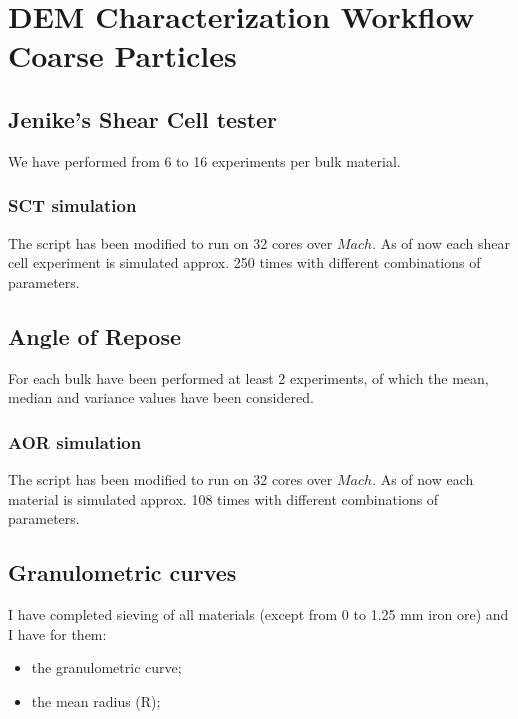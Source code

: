 
\section{DEM Characterization Workflow Coarse Particles}
\label{section:Demcharacterizationworkflowcoarseparticles}

\subsection{Jenike's  Shear Cell tester}
\label{subsection:jenikeshearcell}

We have performed from 6 to 16 experiments per bulk material.\\

\subsubsection{SCT simulation}
\label{subsubsection:sctsimulation}

The script has been modified to run on 32 cores over $Mach$. As of now each shear cell experiment is simulated approx. 250 times with different combinations of parameters.\\

\subsection{Angle of Repose}
\label{subsection:aor}

For each bulk have been performed at least 2 experiments, of which the mean, median and variance values have been considered.\\

\subsubsection{AOR simulation}
\label{subsubsection:aorsimulation}

The script has been modified to run on 32 cores over $Mach$. As of now each material is simulated approx. 108 times with different combinations of parameters.\\

\subsection{Granulometric curves}
\label{subsection:granulometric curves}

I have completed sieving of all materials (except from 0 to 1.25 mm iron ore) and I have for them:
\begin{itemize}
\item{the granulometric curve;}
\item{the mean radius (R);}
\end{itemize}